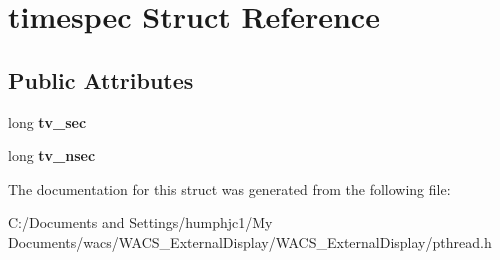 \hypertarget{structtimespec}{
\section{timespec Struct Reference}
\label{structtimespec}
}
\subsection*{Public Attributes}
\begin{DoxyCompactItemize}
\item 
\hypertarget{structtimespec_a7f721245559c9b01a5cc7768086faf04}{
long {\bfseries tv\_\-sec}}
\label{structtimespec_a7f721245559c9b01a5cc7768086faf04}

\item 
\hypertarget{structtimespec_ae3c7510dafa8cbcaede866ed13c99683}{
long {\bfseries tv\_\-nsec}}
\label{structtimespec_ae3c7510dafa8cbcaede866ed13c99683}

\end{DoxyCompactItemize}


The documentation for this struct was generated from the following file:\begin{DoxyCompactItemize}
\item 
C:/Documents and Settings/humphjc1/My Documents/wacs/WACS\_\-ExternalDisplay/WACS\_\-ExternalDisplay/pthread.h\end{DoxyCompactItemize}
